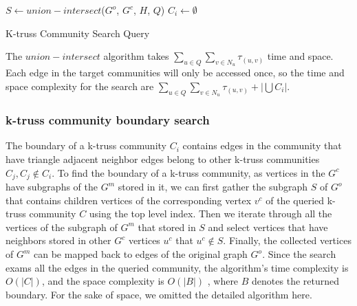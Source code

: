 \begin{algorithm}
	\BlankLine
	$S \gets union-intersect$($G^o$, $G^c$, $H$, $Q$)\;
	 {
		$C_i \gets \emptyset$\;
	}
	\caption{K-truss Community Search Query}\label{alg:search_query}
\end{algorithm}

The $union-intersect$ algorithm takes $\sum_{u \in Q}{\sum_{v \in N_u}{\tau_{(u,v)}}}$ time and space. Each edge in the target communities will only be accessed once, so the time and space complexity for the search are $\sum_{u \in Q}{\sum_{v \in N_u}{\tau_{(u,v)}}} + |\bigcup{C_i}|$.


\subsubsection{k-truss community boundary search}
\label{boundary search}

The boundary of a k-truss community $C_i$ contains edges in the community that have triangle adjacent neighbor edges belong to other k-truss communities $C_j, C_j \notin C_i$. To find the boundary of a k-truss community, as vertices in the \treeindex{} $G^c$ have subgraphs of the \inducedgraph{} $G^m$ stored in it, we can first gather the subgraph $S$ of $G^o$ that contains children vertices of the corresponding vertex $v^c$ of the queried k-truss community $C$ using the top level index. Then we iterate through all the vertices of the subgraph of $G^m$ that stored in $S$ and select vertices that have neighbors stored in other $G^c$ vertices $u^c$ that $u^c \notin S$. Finally, the collected vertices of $G^m$ can be mapped back to edges of the original graph $G^o$. Since the search exams all the edges in the queried community, the algorithm's time complexity is $O(|C|)$, and the space complexity is $O(|B|)$ , where $B$ denotes the returned boundary. For the sake of space, we omitted the detailed algorithm here.

